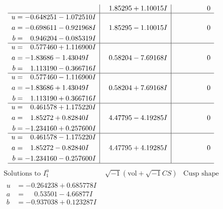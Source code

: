 \documentclass[1p]{elsarticle_modified}
\theoremstyle{definition}
\newcommand{\I}{\sqrt{-1}}
\begin{document}
$$\begin{array}{c|c|c}
 & \phantom{-}1.85295 + 1.10015 I & \phantom{-0.000000 } 0 \\ \hline\begin{aligned}
u &= -0.648251 - 1.072510 I \\
a &= -0.698611 - 0.921968 I \\
b &= \phantom{-}0.946204 - 0.085319 I\end{aligned}
 & \phantom{-}1.85295 - 1.10015 I & \phantom{-0.000000 } 0 \\ \hline\begin{aligned}
u &= \phantom{-}0.577460 + 1.116900 I \\
a &= -1.83686 - 1.43049 I \\
b &= \phantom{-}1.113190 - 0.366716 I\end{aligned}
 & \phantom{-}0.58204 - 7.69168 I & \phantom{-0.000000 } 0 \\ \hline\begin{aligned}
u &= \phantom{-}0.577460 - 1.116900 I \\
a &= -1.83686 + 1.43049 I \\
b &= \phantom{-}1.113190 + 0.366716 I\end{aligned}
 & \phantom{-}0.58204 + 7.69168 I & \phantom{-0.000000 } 0 \\ \hline\begin{aligned}
u &= \phantom{-}0.461578 + 1.175220 I \\
a &= \phantom{-}1.85272 + 0.82840 I \\
b &= -1.234160 + 0.257600 I\end{aligned}
 & \phantom{-}4.47795 - 4.19285 I & \phantom{-0.000000 } 0 \\ \hline\begin{aligned}
u &= \phantom{-}0.461578 - 1.175220 I \\
a &= \phantom{-}1.85272 - 0.82840 I \\
b &= -1.234160 - 0.257600 I\end{aligned}
 & \phantom{-}4.47795 + 4.19285 I & \phantom{-0.000000 } 0\\
 \hline 
 \end{array}$$\newpage$$\begin{array}{c|c|c}  
\text{Solutions to }I^u_{1}& \I (\text{vol} + \sqrt{-1}CS) & \text{Cusp shape}\\
 \hline 
\begin{aligned}
u &= -0.264238 + 0.685778 I \\
a &= \phantom{-}0.53501 - 4.66877 I \\
b &= -0.937038 + 0.123287 I\end{aligned}

\end{array}$$
\end{document}

